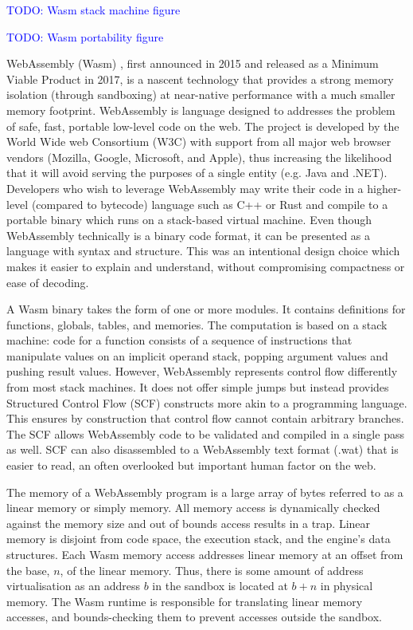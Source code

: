 \textcolor{blue}{TODO: Wasm stack machine figure}

\textcolor{blue}{TODO: Wasm portability figure}

WebAssembly (Wasm) \cite{wasm}, first announced in 2015 and released as a Minimum Viable Product in 2017, is a nascent technology that provides a strong memory isolation (through sandboxing) at near-native performance with a much smaller memory footprint. WebAssembly is language designed to addresses the problem of safe, fast, portable low-level code on the web. The project is developed by the World Wide web Consortium (W3C) with support from all major web browser vendors (Mozilla, Google, Microsoft, and Apple), thus increasing the likelihood that it will avoid serving the purposes of a single entity (e.g. Java and .NET). Developers who wish to leverage WebAssembly may write their code in a higher-level (compared to bytecode) language such as C++ or Rust and compile to a portable binary which runs on a stack-based virtual machine. Even though WebAssembly technically is a binary code format, it can be presented as a language with syntax and structure. This was an intentional design choice which makes it easier to explain and understand, without compromising compactness or ease of decoding.

A Wasm binary takes the form of one or more modules. It contains definitions for functions, globals, tables, and memories. The computation is based on a stack machine: code for a function consists of a sequence of instructions that manipulate values on an implicit operand stack, popping argument values and pushing result values. However, WebAssembly represents control flow differently from most stack machines. It does not offer simple jumps but instead provides Structured Control Flow (SCF) constructs more akin to a programming language. This ensures by construction that control flow cannot contain arbitrary branches. The SCF allows WebAssembly code to be validated and compiled in a single pass as well. SCF can also disassembled to a WebAssembly text format (.wat) that is easier to read, an often overlooked but important human factor on the web.

The memory of a WebAssembly program is a large array of bytes referred to as a linear memory or simply memory. All memory access is dynamically checked against the memory size and out of bounds access results in a trap. Linear memory is disjoint from code space, the execution stack, and the engine's data structures. Each Wasm memory access addresses linear memory at an offset from the base, $n$, of the linear memory. Thus, there is some amount of address virtualisation as an address $b$ in the sandbox is located at $b + n$ in physical memory. The Wasm runtime is responsible for translating linear memory accesses, and bounds-checking them to prevent accesses outside the sandbox.

